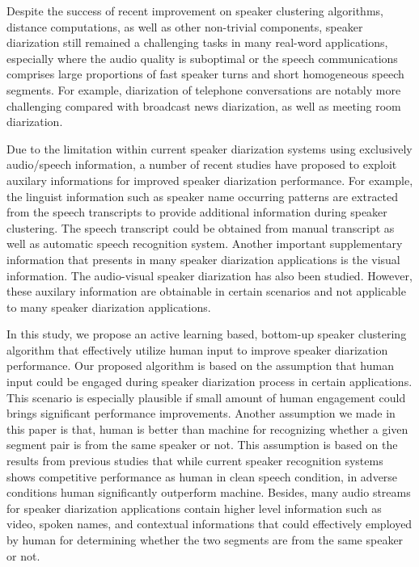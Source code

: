 \documentclass[journal]{IEEEtran}
\begin{document}
Despite the success of recent improvement on speaker clustering algorithms, distance computations, as well as other non-trivial components, speaker diarization still remained a challenging tasks in many real-word applications, especially where the audio quality is suboptimal or the speech communications comprises large proportions of fast speaker turns and short homogeneous speech segments. For example, diarization of telephone conversations are notably more challenging compared with broadcast news diarization, as well as meeting room diarization. 

Due to the limitation within current speaker diarization systems using exclusively audio/speech information, a number of recent studies have proposed to exploit auxilary informations for improved speaker diarization performance. For example, the linguist information such as speaker name occurring patterns are extracted from the speech transcripts to provide additional information during speaker clustering. The speech transcript could be obtained from manual transcript as well as automatic speech recognition system. Another important supplementary information that presents in many speaker diarization applications is the visual information. The audio-visual speaker diarization has also been studied. However, these auxilary information are obtainable in certain scenarios and not applicable to  many speaker diarization applications.

In this study, we propose an active learning based, bottom-up speaker clustering algorithm that effectively utilize human input to improve speaker diarization performance. Our proposed algorithm is based on the assumption that human input could be engaged during speaker diarization process in certain applications. This scenario is especially plausible if small amount of human engagement could brings significant performance improvements. Another assumption we made in this paper is that, human is better than machine for recognizing whether a given segment pair is from the same speaker or not. This assumption is based on the results from previous studies that while current speaker recognition systems shows competitive performance as human in clean speech condition, in adverse conditions human significantly outperform machine. Besides, many audio streams for speaker diarization applications contain higher level information such as video, spoken names, and contextual informations that could effectively employed by human for determining whether the two segments are from the same speaker or not.
\end{document}
